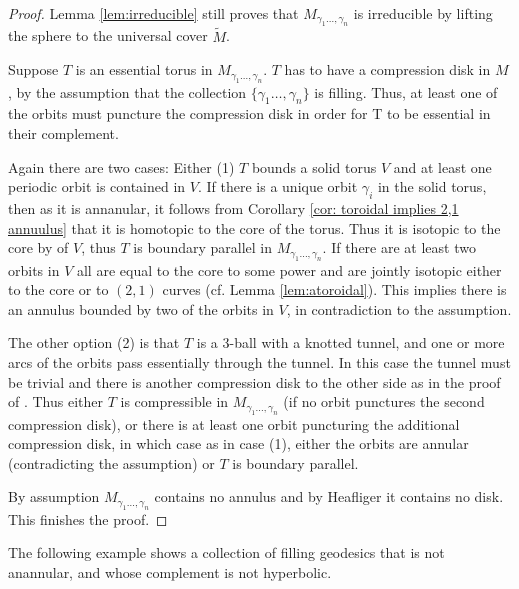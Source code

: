 \documentclass[12pt]{amsart}
\theoremstyle{definition}
\theoremstyle{remark}
\begin{document}
\begin{proof}
 Lemma \ref{lem:irreducible} still proves that $M_{\gamma_1\dots,\gamma_n}$ is irreducible by lifting the sphere to the universal cover $\tilde M$.

Suppose $T$ is an essential torus in $M_{\gamma_1\dots,\gamma_n}$. $T$ has to have a compression disk in $M$, by the assumption that the collection $\{\gamma_1\dots,\gamma_n\}$ is filling. Thus, at least one of the orbits must puncture the compression disk in order for T to be essential in their complement.

Again there are two cases:
Either (1) $T$ bounds a solid torus $V$ and  at least one periodic orbit is contained in $V$. If there is a unique orbit $\gamma_i$ in the solid torus, then as it is annanular, it follows from Corollary \ref{cor: toroidal implies 2,1 annuulus} that it is homotopic to the core of the torus. Thus it is isotopic to the core by  of $V$, thus $T$ is boundary parallel in $M_{\gamma_1\dots,\gamma_n}$. If there are at least two orbits in $V$ all are equal to the core to some power and are jointly isotopic either to the core or to $(2,1)$ curves (cf. Lemma \ref{lem:atoroidal}). 
This implies there is an annulus bounded by two of the orbits in $V$, in contradiction to the assumption. 

The other option (2) is that $T$ is a 3-ball with a knotted tunnel, and one or more arcs of the orbits pass essentially through the tunnel. In this case the tunnel must be trivial and there is another compression disk to the other side as in the proof of . Thus either $T$ is compressible in $M_{\gamma_1\dots,\gamma_n}$ (if no orbit punctures the second compression disk), or there is at least one orbit puncturing the additional compression disk, in which case as in case (1), either the orbits are annular (contradicting the assumption) or $T$ is boundary parallel.

By assumption $M_{\gamma_1\dots,\gamma_n}$ contains no annulus and by Heafliger it contains no disk. This finishes the proof.
\end{proof}

The following example shows a collection of filling geodesics that is not anannular, and whose complement is not hyperbolic.  
\end{document}
